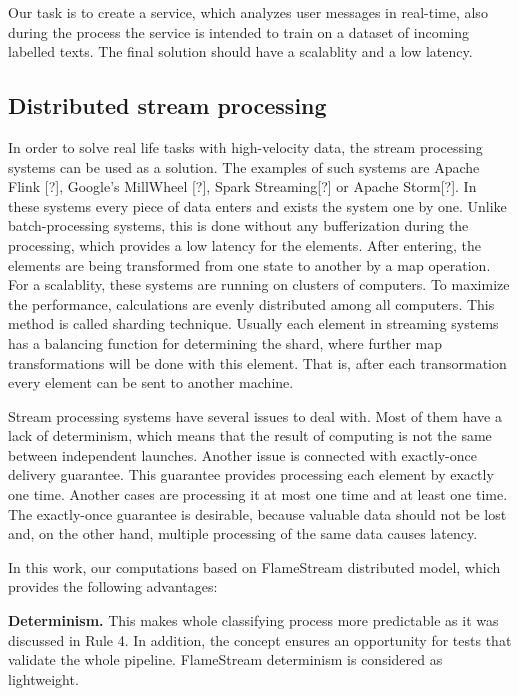 
Our task is to create a service, which analyzes user messages in real-time, also during the process the service is intended to train on a dataset of incoming labelled texts. The final solution should have a scalablity and a low latency.

\subsection{Distributed stream processing}

In order to solve real life tasks with high-velocity data, the stream processing systems can be used as a solution. The examples of such systems are Apache Flink [?], Google's MillWheel [?], Spark Streaming[?] or Apache Storm[?]. In these systems every piece of data enters and exists the system one by one. Unlike batch-processing systems, this is done without any bufferization during the processing, which provides a low latency for the elements. After entering, the elements are being transformed from one state to another by a map operation. For a scalablity, these systems are running on clusters of computers. To maximize the performance, calculations are evenly distributed among all computers. This method is called sharding technique. Usually each element in streaming systems has a balancing function for determining the shard, where further map transformations will be done with this element. That is, after each transormation every element can be sent to another machine. 

Stream processing systems have several issues to deal with. Most of them have a lack of determinism, which means that the result of computing is not the same between independent launches. Another issue is connected with exactly-once delivery guarantee. This guarantee provides processing each element by exactly one time. Another cases are processing it at most one time and at least one time. The exactly-once guarantee is desirable, because valuable data should not be lost and, on the other hand, multiple processing of the same data causes latency.

In this work, our computations based on FlameStream \cite{kuralenok2018flamestream} distributed model, which provides the following advantages:

\textbf{Determinism.} This makes whole classifying process more predictable as it was discussed in \cite{stonebraker20058} Rule 4. In addition, the concept ensures an opportunity for tests that validate the whole pipeline. FlameStream determinism is considered as lightweight.

